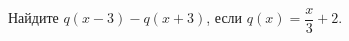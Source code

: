 \begin{ex}
	\begin{condition}
		Найдите \( q(x-3)-q(x+3) \), если \( q(x)=\dfrac{x}{3}+2 \).
	\end{condition}
\end{ex}